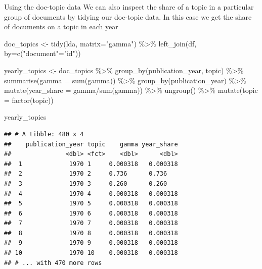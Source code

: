 \documentclass[
  10pt,
  ignorenonframetext,
  aspectratio=169]{beamer}
\newenvironment{Shaded}{\begin{snugshade}}{\end{snugshade}}
\newcommand{\AttributeTok}[1]{\textcolor[rgb]{0.80,0.80,0.80}{#1}}
\newcommand{\FunctionTok}[1]{\textcolor[rgb]{0.94,0.94,0.56}{#1}}
\newcommand{\NormalTok}[1]{\textcolor[rgb]{0.80,0.80,0.80}{#1}}
\newcommand{\OtherTok}[1]{\textcolor[rgb]{0.94,0.94,0.56}{#1}}
\newcommand{\SpecialCharTok}[1]{\textcolor[rgb]{0.86,0.64,0.64}{#1}}
\newcommand{\StringTok}[1]{\textcolor[rgb]{0.80,0.58,0.58}{#1}}
\begin{document}
\begin{frame}[fragile]{Using the doc-topic data}
\protect\hypertarget{using-the-doc-topic-data}{}
We can also inspect the share of a topic in a particular group of
documents by tidying our doc-topic data. In this case we get the share
of documents on a topic in each year

\medskip
\scriptsize

\begin{Shaded}
\begin{Highlighting}[]
\NormalTok{doc\_topics }\OtherTok{\textless{}{-}} \FunctionTok{tidy}\NormalTok{(lda, }\AttributeTok{matrix=}\StringTok{"gamma"}\NormalTok{) }\SpecialCharTok{\%\textgreater{}\%}
  \FunctionTok{left\_join}\NormalTok{(df, }\AttributeTok{by=}\FunctionTok{c}\NormalTok{(}\StringTok{"document"}\OtherTok{=}\StringTok{"id"}\NormalTok{))}

\NormalTok{yearly\_topics }\OtherTok{\textless{}{-}}\NormalTok{ doc\_topics }\SpecialCharTok{\%\textgreater{}\%} 
  \FunctionTok{group\_by}\NormalTok{(publication\_year, topic) }\SpecialCharTok{\%\textgreater{}\%}
  \FunctionTok{summarise}\NormalTok{(}\AttributeTok{gamma =} \FunctionTok{sum}\NormalTok{(gamma)) }\SpecialCharTok{\%\textgreater{}\%}
  \FunctionTok{group\_by}\NormalTok{(publication\_year) }\SpecialCharTok{\%\textgreater{}\%}
  \FunctionTok{mutate}\NormalTok{(}\AttributeTok{year\_share =}\NormalTok{ gamma}\SpecialCharTok{/}\FunctionTok{sum}\NormalTok{(gamma)) }\SpecialCharTok{\%\textgreater{}\%}
  \FunctionTok{ungroup}\NormalTok{() }\SpecialCharTok{\%\textgreater{}\%}
  \FunctionTok{mutate}\NormalTok{(}\AttributeTok{topic =} \FunctionTok{factor}\NormalTok{(topic))}

\NormalTok{yearly\_topics}
\end{Highlighting}
\end{Shaded}

\begin{verbatim}
## # A tibble: 480 x 4
##    publication_year topic    gamma year_share
##               <dbl> <fct>    <dbl>      <dbl>
##  1             1970 1     0.000318   0.000318
##  2             1970 2     0.736      0.736   
##  3             1970 3     0.260      0.260   
##  4             1970 4     0.000318   0.000318
##  5             1970 5     0.000318   0.000318
##  6             1970 6     0.000318   0.000318
##  7             1970 7     0.000318   0.000318
##  8             1970 8     0.000318   0.000318
##  9             1970 9     0.000318   0.000318
## 10             1970 10    0.000318   0.000318
## # ... with 470 more rows
\end{verbatim}
\end{frame}
\end{document}
